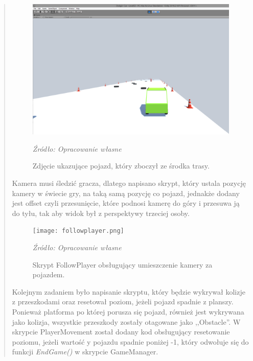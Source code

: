 \begin{quotation}
\begin{figure}[!h]
\centering
  \includegraphics[width=1\linewidth]{playermovelook.png}
  \caption{Zdjęcie ukazujące pojazd, który zboczył ze środka trasy.}\label{rys_5}
  \begin{minipage}[t]{0.75\linewidth}
    \emph{Źródło: Opracowanie własne}
  \end{minipage}
\end{figure}

\newpage
\indent Kamera musi śledzić gracza, dlatego napisano skrypt, który ustala pozycję kamery w świecie gry, na taką samą pozycję co pojazd, jednakże dodany jest offset czyli przesunięcie, które podnosi kamerę do góry i przesuwa ją do tyłu, tak aby widok był z perspektywy trzeciej osoby.

\begin{figure}[!h]
\centering
  \texttt{[image: followplayer.png]}
  \caption{Skrypt FollowPlayer obsługujący umieszczenie kamery za pojazdem.}\label{rys_6}
  \begin{minipage}[t]{0.75\linewidth}
    \emph{Źródło: Opracowanie własne}
  \end{minipage}
\end{figure}
\indent Kolejnym zadaniem było napisanie skryptu, który będzie wykrywał kolizje z przeszkodami oraz resetował poziom, jeżeli pojazd spadnie z planszy. Ponieważ platforma po której porusza się pojazd, również jest wykrywana jako kolizja, wszystkie przeszkody zostały otagowane jako ,,Obstacle''. W skrypcie PlayerMovement został dodany kod obsługujący resetowanie poziomu, jeżeli wartość y pojazdu spadnie poniżej -1, który odwołuje się do funkcji \textit{EndGame()} w skrypcie GameManager.


\end{quotation}
